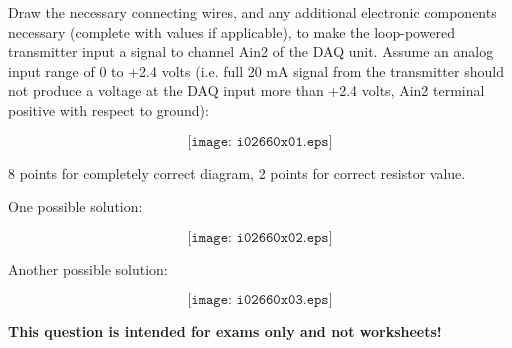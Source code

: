 

Draw the necessary connecting wires, and any additional electronic components necessary (complete with values if applicable), to make the loop-powered transmitter input a signal to channel Ain2 of the DAQ unit.  Assume an analog input range of 0 to +2.4 volts (i.e. full 20 mA signal from the transmitter should not produce a voltage at the DAQ input more than +2.4 volts, Ain2 terminal positive with respect to ground):

$$\texttt{[image: i02660x01.eps]}$$







8 points for completely correct diagram, 2 points for correct resistor value.

\vskip 10pt

One possible solution:

$$\texttt{[image: i02660x02.eps]}$$

Another possible solution:

$$\texttt{[image: i02660x03.eps]}$$








{\bf This question is intended for exams only and not worksheets!}



